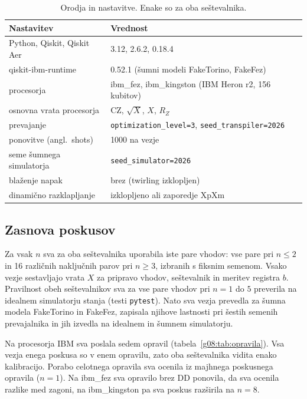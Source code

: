 \begin{table}[tbp]
\caption{Orodja in nastavitve. Enake so za oba seštevalnika.}
\label{g08:tab:nastavitve}
\centering
\small
\begin{tabular}{ll}
\toprule
Nastavitev & Vrednost \\
\midrule
Python, Qiskit, Qiskit Aer & 3.12, 2.6.2, 0.18.4 \\
qiskit-ibm-runtime & 0.52.1 (šumni modeli FakeTorino, FakeFez) \\
procesorja & ibm\_fez, ibm\_kingston (IBM Heron r2, 156 kubitov) \\
osnovna vrata procesorja & CZ, $\sqrt{X}$, $X$, $R_Z$ \\
prevajanje & \texttt{optimization\_level=3}, \texttt{seed\_transpiler=2026} \\
ponovitve (angl.\ shots) & 1000 na vezje \\
seme šumnega simulatorja & \texttt{seed\_simulator=2026} \\
blaženje napak & brez (twirling izklopljen) \\
dinamično razklapljanje & izklopljeno ali zaporedje XpXm \\
\bottomrule
\end{tabular}
\end{table}

\subsection{Zasnova poskusov}
\label{g08:sec:poskusi}

Za vsak $n$ sva za oba seštevalnika uporabila iste pare vhodov: vse pare pri $n \le 2$ in 16 različnih naključnih parov pri $n \ge 3$, izbranih s fiksnim semenom. Vsako vezje sestavljajo vrata $X$ za pripravo vhodov, seštevalnik in meritev registra $b$. Pravilnost obeh seštevalnikov sva za vse pare vhodov pri $n = 1$ do $5$ preverila na idealnem simulatorju stanja (testi \texttt{pytest}). Nato sva vezja prevedla za šumna modela FakeTorino in FakeFez, zapisala njihove lastnosti pri šestih semenih prevajalnika in jih izvedla na idealnem in šumnem simulatorju.

Na procesorja IBM sva poslala sedem opravil (tabela~\ref{g08:tab:opravila}). Vsa vezja enega poskusa so v enem opravilu, zato oba seštevalnika vidita enako kalibracijo. Porabo celotnega opravila sva ocenila iz majhnega poskusnega opravila ($n = 1$). Na ibm\_fez sva opravilo brez DD ponovila, da sva ocenila razlike med zagoni, na ibm\_kingston pa sva poskus razširila na $n = 8$.

